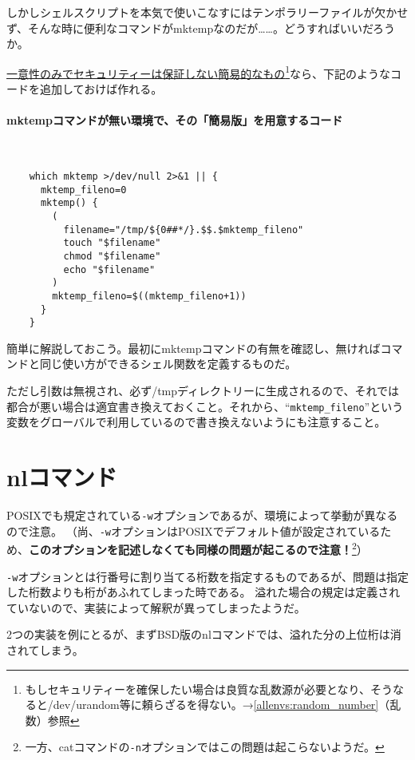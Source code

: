 しかしシェルスクリプトを本気で使いこなすにはテンポラリーファイルが欠かせず、そんな時に便利なコマンドがmktempなのだが……。どうすればいいだろうか。

\underline{一意性のみでセキュリティーは保証しない簡易的なもの}\footnote{もしセキュリティーを確保したい場合は良質な乱数源が必要となり、そうなると/dev/urandom等に頼らざるを得ない。→\ref{allenvs:random_number}（乱数）参照}なら、下記のようなコードを追加しておけば作れる。

\paragraph{mktempコマンドが無い環境で、その「簡易版」を用意するコード} 　\\
\begin{frameboxit}{160.0mm}
\begin{verbatim}
	which mktemp >/dev/null 2>&1 || {
	  mktemp_fileno=0
	  mktemp() {
	    (
	      filename="/tmp/${0##*/}.$$.$mktemp_fileno"
	      touch "$filename"
	      chmod "$filename"
	      echo "$filename"
	    )
	    mktemp_fileno=$((mktemp_fileno+1))
	  }
	}
\end{verbatim}
\end{frameboxit}

簡単に解説しておこう。最初にmktempコマンドの有無を確認し、無ければコマンドと同じ使い方ができるシェル関数を定義するものだ。

ただし引数は無視され、必ず/tmpディレクトリーに生成されるので、それでは都合が悪い場合は適宜書き換えておくこと。それから、``\verb|mktemp_fileno|''という変数をグローバルで利用しているので書き換えないようにも注意すること。

\section{nlコマンド}

POSIXでも規定されている\verb|-w|オプションであるが、環境によって挙動が異なるので注意。
（尚、\verb|-w|オプションはPOSIXでデフォルト値が設定されているため、\textbf{このオプションを記述しなくても同様の問題が起こるので注意！}\footnote{一方、catコマンドの\verb|-n|オプションではこの問題は起こらないようだ。}）

\verb|-w|オプションとは行番号に割り当てる桁数を指定するものであるが、問題は指定した桁数よりも桁があふれてしまった時である。
溢れた場合の規定は定義されていないので、実装によって解釈が異ってしまったようだ。

2つの実装を例にとるが、まずBSD版のnlコマンドでは、溢れた分の上位桁は消されてしまう。

